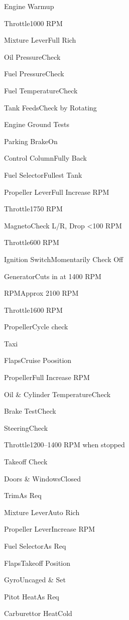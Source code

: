 \documentclass[sim-use]{checklist}
\begin{document}
\begin{checklist}{Engine Warmup}
  \item{Throttle}{1000 RPM}
   {
    \item{Mixture Lever}{Full Rich}
  }
  \item{Oil Pressure}{Check}
  \item{Fuel Pressure}{Check}
  \item{Fuel Temperature}{Check}
  \item{Tank Feeds}{Check by Rotating}
\end{checklist}

\begin{checklist}{Engine Ground Tests}
  \item{Parking Brake}{On}
  \item{Control Column}{Fully Back}
  \item{Fuel Selector}{Fullest Tank}
  \item{Propeller Lever}{Full Increase RPM}
  \item{Throttle}{1750 RPM}
  \item{Magneto}{Check L/R, Drop <100 RPM}
  \item{Throttle}{600 RPM}
  \item{Ignition Switch}{Momentarily Check Off}
   {
    \item{Generator}{Cuts in at 1400 RPM}
    \item{RPM}{Approx 2100 RPM}
  }
  \item{Throttle}{1600 RPM}
  \item{Propeller}{Cycle check}
\end{checklist}

\begin{checklist}{Taxi}
  \item{Flaps}{Cruise Poosition}
  \item{Propeller}{Full Increase RPM}
  \item{Oil \& Cylinder Temperature}{Check}
  \item{Brake Test}{Check}
  \item{Steering}{Check}
  \item{Throttle}{1200--1400 RPM when stopped}
\end{checklist}

\begin{checklist}{Takeoff Check}
  \item{Doors \& Windows}{Closed}
  \item{Trim}{As Req}
  \item{Mixture Lever}{Auto Rich}
  \item{Propeller Lever}{Increase RPM}
  \item{Fuel Selector}{As Req}
  \item{Flaps}{Takeoff Position}
  \item{Gyro}{Uncaged \& Set}
  \item{Pitot Heat}{As Req}
  \item{Carburettor Heat}{Cold}
\end{checklist}
\end{document}
